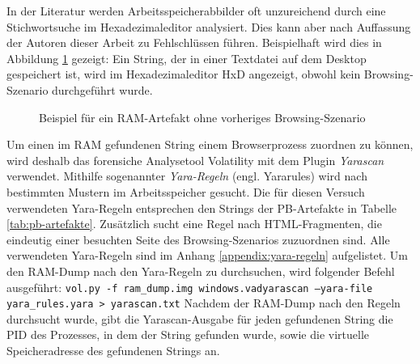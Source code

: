 In der Literatur werden Arbeitsspeicherabbilder oft unzureichend durch eine Stichwortsuche im Hexadezimaleditor analysiert. \cite{Rochmadi.2017, Md.2018, Montasari.2015}
Dies kann aber nach Auffassung der Autoren dieser Arbeit zu Fehlschlüssen führen. Beispielhaft wird dies in Abbildung \ref{img:textfile-ram-artifact} gezeigt: Ein String, der in einer Textdatei auf dem Desktop gespeichert ist, wird im Hexadezimaleditor HxD angezeigt, obwohl kein Browsing-Szenario durchgeführt wurde.
\begin{figure}[h!]
	\centering
	\hfill
	\caption{Beispiel für ein RAM-Artefakt ohne vorheriges Browsing-Szenario}
	\label{img:textfile-ram-artifact}  
\end{figure}

Um einen im RAM gefundenen String einem Browserprozess zuordnen zu können, wird deshalb das forensiche Analysetool Volatility mit dem Plugin \textit{Yarascan} verwendet.
Mithilfe sogenannter \textit{Yara-Regeln} (engl. Yararules) wird nach bestimmten Mustern im Arbeitsspeicher gesucht.
Die für diesen Versuch verwendeten Yara-Regeln entsprechen den Strings der PB-Artefakte in Tabelle \ref{tab:pb-artefakte}. Zusätzlich sucht eine Regel nach HTML-Fragmenten, die eindeutig einer besuchten Seite des Browsing-Szenarios zuzuordnen sind. \cite{Said.2011}
Alle verwendeten Yara-Regeln sind im Anhang \ref{appendix:yara-regeln} aufgelistet.
Um den RAM-Dump nach den Yara-Regeln zu durchsuchen, wird folgender Befehl ausgeführt: \texttt{vol.py -f ram\_dump.img windows.vadyarascan --yara-file yara\_rules.yara > yarascan.txt}
Nachdem der RAM-Dump nach den Regeln durchsucht wurde, gibt die Yarascan-Ausgabe für jeden gefundenen String die PID des Prozesses, in dem der String gefunden wurde, sowie die virtuelle Speicheradresse des gefundenen Strings an.

